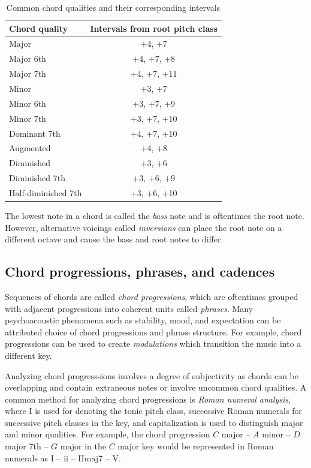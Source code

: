 \begin{table}[tb]
    \centering
    \caption{Common chord qualities and their corresponding intervals \citep{freedman2015correlational}}
    \label{tab:chord-qualities}
    \begin{tabular}{lc}
        \toprule
        Chord quality & Intervals from root pitch class \\
        \midrule
        Major & +4, +7 \\
        Major 6th & +4, +7, +8 \\
        Major 7th & +4, +7, +11 \\
        Minor & +3, +7 \\
        Minor 6th & +3, +7, +9 \\
        Minor 7th & +3, +7, +10 \\
        Dominant 7th & +4, +7, +10 \\
        Augmented & +4, +8 \\
        Diminished & +3, +6 \\
        Diminished 7th & +3, +6, +9 \\
        Half-diminished 7th & +3, +6, +10 \\
        \bottomrule
    \end{tabular}
\end{table}

The lowest note in a chord is called the \emph{bass} note and is oftentimes the
root note. However, alternative voicings called \emph{inversions} can place the
root note on a different octave and cause the bass and root notes to
differ.

\subsection{Chord progressions, phrases, and cadences}

Sequences of chords are called \emph{chord progressions}, which are oftentimes
grouped with adjacent progressions into coherent units called \emph{phrases}.
Many psychoacoustic phenomena such as stability, mood, and expectation can be
attributed choice of chord progressions and phrase structure. For example,
chord progressions can be used to create \emph{modulations} which transition
the music into a different key.

Analyzing chord progresssions involves a degree of subjectivity as chords can
be overlapping and contain extraneous notes or involve uncommon chord
qualities. A common method for analyzing chord progressions is \emph{Roman
numeral analysis}, where \RN{1} is used for denoting the tonic pitch class,
successive Roman numerals for successive pitch classes in the key, and
capitalization is used to distinguish major and minor qualities. For example,
the chord progression $C$ major -- $A$ minor -- $D$ major 7th -- $G$ major in
the $C$ major key would be represented in Roman numerals as \RN{1} -- \Rn{2} --
\RN{2}maj$7$ -- \RN{5}.

